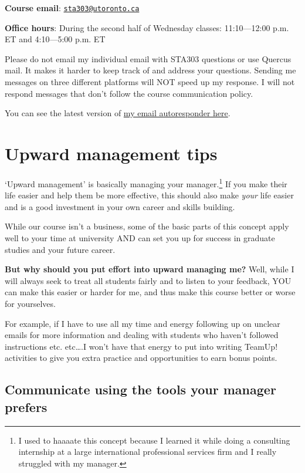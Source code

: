 \documentclass[
  openany]{book}
\begin{document}
\textbf{Course email}: \href{mailto:sta303@utoronto.ca}{\nolinkurl{sta303@utoronto.ca}}

\textbf{Office hours}: During the second half of Wednesday classes: 11:10---12:00 p.m. ET and 4:10---5:00 p.m. ET

Please do not email my individual email with STA303 questions or use Quercus mail. It makes it harder to keep track of and address your questions. Sending me messages on three different platforms will NOT speed up my response. I will not respond messages that don't follow the course communication policy.

You can see the latest version of \href{https://www.lizabolton.com/autoresponder.html}{my email autoresponder here}.

\hypertarget{upward-management-tips}{%
\section{Upward management tips}\label{upward-management-tips}}

`Upward management' is basically managing your manager.\footnote{I used to haaaate this concept because I learned it while doing a consulting internship at a large international professional services firm and I really struggled with my manager.} If you make their life easier and help them be more effective, this should also make \emph{your} life easier and is a good investment in your own career and skills building.

While our course isn't a business, some of the basic parts of this concept apply well to your time at university AND can set you up for success in graduate studies and your future career.

\textbf{But why should you put effort into upward managing me?} Well, while I will always seek to treat all students fairly and to listen to your feedback, YOU can make this easier or harder for me, and thus make this course better or worse for yourselves.

For example, if I have to use all my time and energy following up on unclear emails for more information and dealing with students who haven't followed instructions etc. etc\ldots.I won't have that energy to put into writing TeamUp! activities to give you extra practice and opportunities to earn bonus points.

\hypertarget{communicate-using-the-tools-your-manager-prefers}{%
\subsection{Communicate using the tools your manager prefers}\label{communicate-using-the-tools-your-manager-prefers}}
\end{document}

